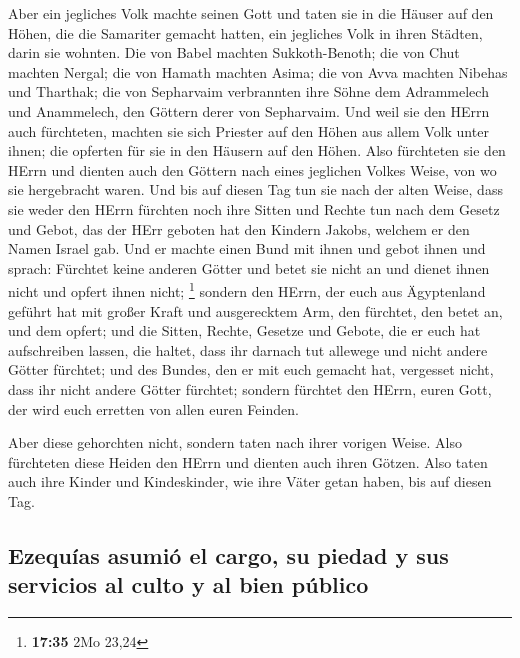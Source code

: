  Aber ein jegliches Volk machte seinen Gott und taten sie
in die Häuser auf den Höhen, die die Samariter gemacht hatten, ein
jegliches Volk in ihren Städten, darin sie wohnten.  Die
von Babel machten Sukkoth-Benoth; die von Chut machten Nergal; die von
Hamath machten Asima;  die von Avva machten Nibehas und
Tharthak; die von Sepharvaim verbrannten ihre Söhne dem Adrammelech und
Anammelech, den Göttern derer von Sepharvaim.  Und weil
sie den HErrn auch fürchteten, machten sie sich Priester auf den Höhen
aus allem Volk unter ihnen; die opferten für sie in den Häusern auf den
Höhen.  Also fürchteten sie den HErrn und dienten auch
den Göttern nach eines jeglichen Volkes Weise, von wo sie hergebracht
waren.  Und bis auf diesen Tag tun sie nach der alten
Weise, dass sie weder den HErrn fürchten noch ihre Sitten und Rechte tun
nach dem Gesetz und Gebot, das der HErr geboten hat den Kindern Jakobs,
welchem er den Namen Israel gab.  Und er machte einen
Bund mit ihnen und gebot ihnen und sprach: Fürchtet keine anderen Götter
und betet sie nicht an und dienet ihnen nicht und opfert ihnen nicht;
\footnote{\textbf{17:35} 2Mo 23,24}  sondern den HErrn,
der euch aus Ägyptenland geführt hat mit großer Kraft und ausgerecktem
Arm, den fürchtet, den betet an, und dem opfert;  und die
Sitten, Rechte, Gesetze und Gebote, die er euch hat aufschreiben lassen,
die haltet, dass ihr darnach tut allewege und nicht andere Götter
fürchtet;  und des Bundes, den er mit euch gemacht hat,
vergesset nicht, dass ihr nicht andere Götter fürchtet; 
sondern fürchtet den HErrn, euren Gott, der wird euch erretten von allen
euren Feinden.

 Aber diese gehorchten nicht, sondern taten nach ihrer
vorigen Weise.  Also fürchteten diese Heiden den HErrn
und dienten auch ihren Götzen. Also taten auch ihre Kinder und
Kindeskinder, wie ihre Väter getan haben, bis auf diesen Tag.

\hypertarget{ezequuxedas-asumiuxf3-el-cargo-su-piedad-y-sus-servicios-al-culto-y-al-bien-puxfablico}{%
\subsection{Ezequías asumió el cargo, su piedad y sus servicios al culto
y al bien
público}\label{ezequuxedas-asumiuxf3-el-cargo-su-piedad-y-sus-servicios-al-culto-y-al-bien-puxfablico}}

